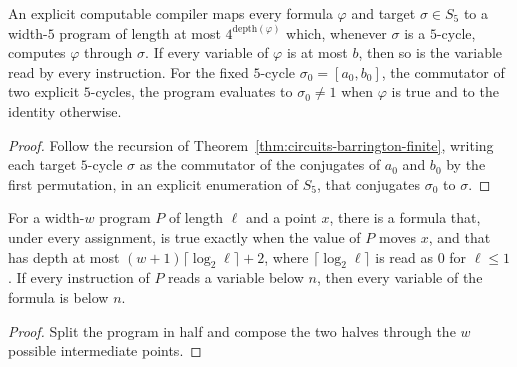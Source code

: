 \begin{theorem}
  \label{thm:circuits-barrington-compiler}
  \leanok
  An explicit computable compiler maps every formula $\varphi$ and target
  $\sigma \in S_5$ to a width-$5$ program of length at most
  $4^{\mathrm{depth}(\varphi)}$ which, whenever $\sigma$ is a $5$-cycle,
  computes $\varphi$ through $\sigma$. If every variable of $\varphi$ is at
  most $b$, then so is the variable read by every instruction. For the fixed
  $5$-cycle $\sigma_0 = [a_0, b_0]$, the commutator of two explicit
  $5$-cycles, the program evaluates to $\sigma_0 \neq 1$ when $\varphi$ is true
  and to the identity otherwise.
\end{theorem}
\begin{proof}
  \leanok
  Follow the recursion of Theorem~\ref{thm:circuits-barrington-finite},
  writing each target $5$-cycle $\sigma$ as the commutator of the conjugates
  of $a_0$ and $b_0$ by the first permutation, in an explicit enumeration of
  $S_5$, that conjugates $\sigma_0$ to $\sigma$.
\end{proof}

\begin{lemma}
  \label{lem:circuits-bp-to-formula}
  \leanok
  For a width-$w$ program $P$ of length $\ell$ and a point $x$, there is a
  formula that, under every assignment, is true exactly when the value of $P$
  moves $x$, and that has depth at most $(w + 1) \lceil \log_2 \ell \rceil + 2$,
  where $\lceil \log_2 \ell \rceil$ is read as $0$ for $\ell \le 1$. If every
  instruction of $P$ reads a variable below $n$, then every variable of the
  formula is below $n$.
\end{lemma}
\begin{proof}
  \leanok
  Split the program in half and compose the two halves through the $w$
  possible intermediate points.
\end{proof}

